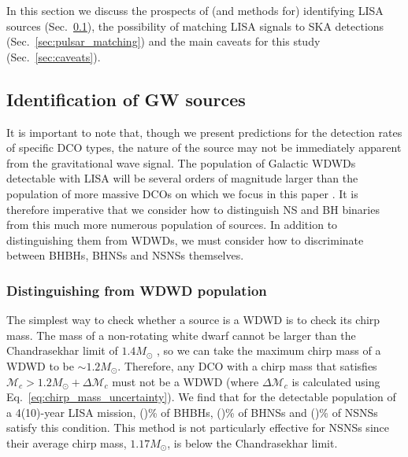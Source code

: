In this section we discuss the prospects of (and methods for) identifying LISA sources (Sec.~\ref{sec:identify_sources}), the possibility of matching LISA signals to SKA detections (Sec.~\ref{sec:pulsar_matching}) and the main caveats for this study (Sec.~\ref{sec:caveats}).

\subsection{Identification of GW sources}\label{sec:identify_sources}
It is important to note that, though we present predictions for the detection rates of specific DCO types, the nature of the source may not be immediately apparent from the gravitational wave signal. The population of Galactic WDWDs detectable with LISA will be several orders of magnitude larger than the population of more massive DCOs on which we focus in this paper \citep[e.g.][]{Korol+2017}. It is therefore imperative that we consider how to distinguish NS and BH binaries from this much more numerous population of sources. In addition to distinguishing them from WDWDs, we must consider how to discriminate between BHBHs, BHNSs and NSNSs themselves.

\subsubsection{Distinguishing from WDWD population}\label{sec:WDWD_distinguish}
The simplest way to check whether a source is a WDWD is to check its chirp mass. The mass of a non-rotating white dwarf cannot be larger than the Chandrasekhar limit of $1.4 \unit{M_\odot}$ \citep{Chandrasekhar+1931, Hamada+1961}, so we can take the maximum chirp mass of a WDWD to be $\sim 1.2 \unit{M_{\odot}}$. Therefore, any DCO with a chirp mass that satisfies $\mathcal{M}_c > 1.2 \unit{M_{\odot}} + \Delta \mathcal{M}_c$ must not be a WDWD (where $\Delta \mathcal{M}_c$ is calculated using Eq.~\ref{eq:chirp_mass_uncertainty}). We find that for the detectable population of a 4(10)-year LISA mission, \BHBHAboveMaxWDWDFourPerc{}(\BHBHAboveMaxWDWDTenPerc{})\% of BHBHs, \BHNSAboveMaxWDWDFourPerc{}(\BHNSAboveMaxWDWDTenPerc{})\% of BHNSs and \NSNSAboveMaxWDWDFourPerc{}(\NSNSAboveMaxWDWDTenPerc{})\% of NSNSs satisfy this condition. This method is not particularly effective for NSNSs since their average chirp mass, $1.17 \unit{M_\odot}$, is below the Chandrasekhar limit.

